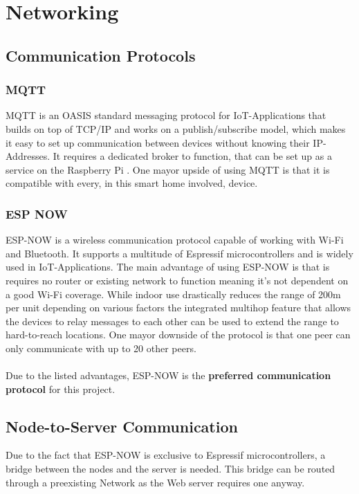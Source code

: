 \chapter{Networking}
\section{Communication Protocols}
    \subsection{MQTT}
    MQTT is an OASIS standard messaging protocol for 
    IoT-Applications that builds on top of TCP/IP and 
    works on a publish/subscribe model, which makes it easy
    to set up communication between devices without knowing
    their IP-Addresses. It requires a dedicated broker to
    function, that can be set up as a service on the 
    Raspberry Pi \cite{mqtt_nodate}.
    One mayor upside of using MQTT is that it is compatible
    with every, in this smart home involved, device.


    \subsection{ESP NOW} 
    ESP-NOW is a wireless communication protocol capable of
    working with Wi-Fi and Bluetooth. It supports a 
    multitude of Espressif microcontrollers and is widely 
    used in IoT-Applications. The main advantage of using
    ESP-NOW is that is requires no router or existing
    network to function meaning it's not dependent on
    a good Wi-Fi coverage. While indoor use drastically
    reduces the range of 200m per unit depending on various
    factors \cite{esp-now-reach_2024} 
    the integrated multihop feature that allows the devices 
    to relay messages to each other can be used to extend 
    the range to hard-to-reach locations. One mayor downside
    of the protocol is that one peer can only communicate with
    up to 20 other peers.
    \\~\\
    Due to the listed advantages, ESP-NOW is the \textbf{preferred
    communication protocol} for this project.


\section{Node-to-Server Communication}
Due to the fact that ESP-NOW is exclusive to Espressif microcontrollers,
a bridge between the nodes and the server is needed. This bridge can be 
routed through a preexisting Network as the Web server requires 
one anyway.


